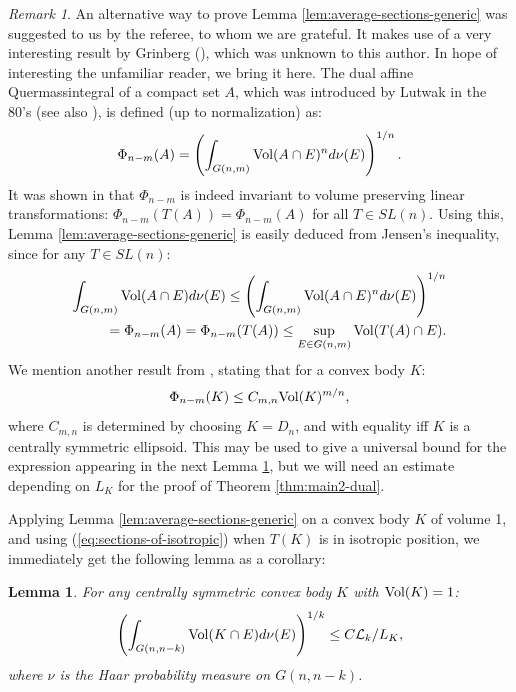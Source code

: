 \documentclass[12pt,oneside]{amsart}
\newtheorem{lem}[thm]{Lemma}
\theoremstyle{definition}
\theoremstyle{remark}
\newtheorem{rem}[thm]{Remark}
\theoremstyle{proof}
\numberwithin{equation}{section}
\newcommand{\brac}[1]{\left(#1\right)}
\newcommand{\Lk}{\mathcal{L}_k}
\newcommand{\Vol}[1]{\textnormal{Vol} (#1)}
\begin{document}
\begin{rem}
An alternative way to prove Lemma
\ref{lem:average-sections-generic} was suggested to us by the
referee, to whom we are grateful. It makes use of a very
interesting result by Grinberg
(\cite{Grinberg-Affine-Invariant}), which was unknown to this
author. In hope of interesting the unfamiliar reader, we bring it
here. The dual affine Quermassintegral of a compact set $A$, which
was introduced by Lutwak in the 80's (see also
\cite{Lutwak-Harmonic}), is defined (up to normalization) as:
\[
\Phi_{n-m}(A) = \brac{\int_{G(n,m)} \Vol{A \cap E}^n
d\nu(E)}^{1/n}.
\]
It was shown in \cite{Grinberg-Affine-Invariant} that
$\Phi_{n-m}$ is indeed invariant to volume preserving linear
transformations: $\Phi_{n-m}(T(A)) = \Phi_{n-m}(A)$ for all $T
\in SL(n)$. Using this, Lemma \ref{lem:average-sections-generic}
is easily deduced from Jensen's inequality, since for any $T\in
SL(n)$:
\begin{eqnarray}
\nonumber \int_{G(n,m)} \Vol{A \cap E} d\nu(E) \leq
\brac{\int_{G(n,m)} \Vol{A \cap E}^n d\nu(E)}^{1/n} \\
\nonumber = \Phi_{n-m}(A) = \Phi_{n-m}(T(A)) \leq \sup_{E \in
G(n,m)} \Vol{T(A) \cap E}.
\end{eqnarray}
We mention another result from \cite{Grinberg-Affine-Invariant},
stating that for a convex body $K$:
\[
\Phi_{n-m}(K) \leq C_{m,n} \Vol{K}^{m/n},
\]
where $C_{m,n}$ is determined by choosing $K = D_n$, and with
equality iff $K$ is a centrally symmetric ellipsoid. This may be
used to give a universal bound for the expression appearing in
the next Lemma \ref{lem:average-sections}, but we will need an
estimate depending on $L_K$ for the proof of Theorem
\ref{thm:main2-dual}.
\end{rem}

Applying Lemma \ref{lem:average-sections-generic} on a convex body
$K$ of volume 1, and using (\ref{eq:sections-of-isotropic}) when
$T(K)$ is in isotropic position, we immediately get the following
lemma as a corollary:

\begin{lem} \label{lem:average-sections}
For any centrally symmetric convex body $K$ with
\mbox{$\Vol{K}=1$:}
\[
\brac{\int_{G(n,n-k)} \Vol{K \cap E} d\nu(E)}^{1/k} \leq C \Lk /
L_K,
\]
where $\nu$ is the Haar probability measure on $G(n,n-k)$.
\end{lem}
\end{document}

